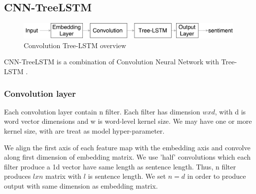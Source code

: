 \subsection{CNN-TreeLSTM}\label{sec:CNNtree}
\begin{figure}[H]
	\centering
	\includegraphics[width=0.8\linewidth]{figure/convtreelstmsummary}
	\caption[Convolution Tree-LSTM overview]{Convolution Tree-LSTM overview}
	\label{fig:convtreelstmsummary}
\end{figure}
CNN-TreeLSTM is a combination of Convolution Neural Network with Tree-LSTM \cite{socher2013recursive}.

\subsubsection{Convolution layer}
Each convolution layer contain n filter. Each filter has dimension $w x d$, with d is word vector dimensions and w is word-level kernel size. We may have one or more kernel size, with are treat as model hyper-parameter. 

We align the first axis of each feature map with the embedding axis and convolve along first dimension of embedding matrix. We use 'half' convolutions which each filter produce a 1d vector have same length as sentence length. Thus, n filter produces $l x n$ matrix with $l$ is sentence length. We set $n = d$ in order to produce output with same dimension as embedding matrix. 

